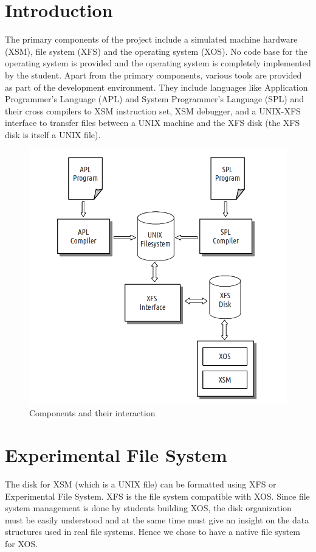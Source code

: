 \documentclass[10pt]{report}
\begin{document}
\section{Introduction}
The primary components of the project include a simulated machine hardware (XSM), file system (XFS) and the operating system (XOS). No code base for the operating system is provided and the operating system is completely implemented by the student. Apart from the primary components, various tools are provided as part of the development environment. They include languages like Application Programmer's Language (APL) and System Programmer's Language (SPL) and their cross compilers to XSM instruction set, XSM debugger, and a UNIX-XFS interface to transfer files between a UNIX machine and the XFS disk (the XFS disk is itself a UNIX file). 

\begin{figure}[hbtp]
\centering
\includegraphics[scale=0.4]{components.png}
\caption{Components and their interaction}
\end{figure}



\section{Experimental File System }
The disk for XSM (which is a UNIX file) can be formatted using XFS or Experimental File System. XFS is the file system compatible with XOS. Since file system management is done by students building XOS, the disk organization must be easily understood and at the same time must give an insight on the data structures used in real file systems. Hence we chose to have a native file system for XOS.\\
\end{document}
